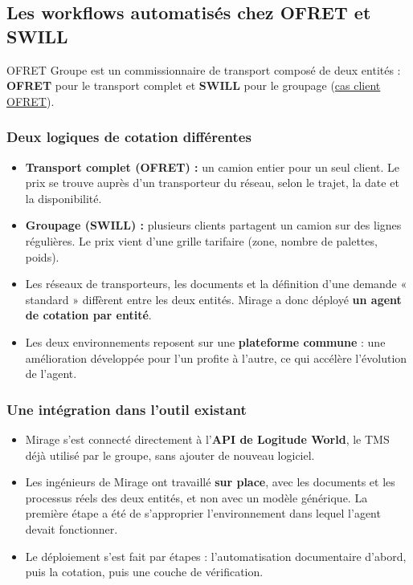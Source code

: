 \documentclass[11pt,a4paper]{article}
\begin{document}
\subsection{Les workflows automatisés chez OFRET et SWILL}

OFRET Groupe est un commissionnaire de transport composé de deux entités : \textbf{OFRET} pour le transport complet et \textbf{SWILL} pour le groupage (\href{https://miragemetrics.com/case-studies/ofret}{cas client OFRET}).

\subsubsection{Deux logiques de cotation différentes}
\begin{itemize}
  \item \textbf{Transport complet (OFRET) :} un camion entier pour un seul client. Le prix se trouve auprès d'un transporteur du réseau, selon le trajet, la date et la disponibilité.
  \item \textbf{Groupage (SWILL) :} plusieurs clients partagent un camion sur des lignes régulières. Le prix vient d'une grille tarifaire (zone, nombre de palettes, poids).
  \item Les réseaux de transporteurs, les documents et la définition d'une demande « standard » diffèrent entre les deux entités. Mirage a donc déployé \textbf{un agent de cotation par entité}.
  \item Les deux environnements reposent sur une \textbf{plateforme commune} : une amélioration développée pour l'un profite à l'autre, ce qui accélère l'évolution de l'agent.
\end{itemize}

\subsubsection{Une intégration dans l'outil existant}
\begin{itemize}
  \item Mirage s'est connecté directement à l'\textbf{API de Logitude World}, le TMS déjà utilisé par le groupe, sans ajouter de nouveau logiciel.
  \item Les ingénieurs de Mirage ont travaillé \textbf{sur place}, avec les documents et les processus réels des deux entités, et non avec un modèle générique. La première étape a été de s'approprier l'environnement dans lequel l'agent devait fonctionner.
  \item Le déploiement s'est fait par étapes : l'automatisation documentaire d'abord, puis la cotation, puis une couche de vérification.
\end{itemize}
\end{document}
